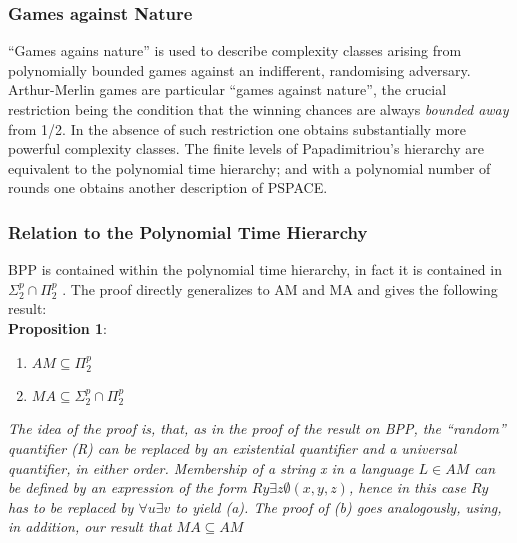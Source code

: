 \documentclass{beamer}
\begin{document}

\begin{frame}
\frametitle{Games against Nature}
``Games agains nature'' is used to describe complexity classes arising from polynomially bounded games against an indifferent, randomising adversary. Arthur-Merlin games are particular ``games against nature'', the crucial restriction being the condition that the winning chances are always \textit{bounded away} from 1/2. In the absence of such restriction one obtains substantially more powerful complexity classes. The finite levels of Papadimitriou’s hierarchy are equivalent to the polynomial time hierarchy; and with a polynomial number of rounds one obtains another description of PSPACE.
\end{frame}

\begin{frame}
\frametitle{Relation to the Polynomial Time Hierarchy}
BPP is contained within the polynomial time hierarchy, in fact it is contained in $\Sigma_2^p \cap \Pi_2^p$ . The proof directly generalizes to AM and MA and gives the following result:\\
\textbf{Proposition 1}:\begin{enumerate}
\item $AM \subseteq \Pi_2^p$
\item   $MA \subseteq \Sigma_2^p \cap \Pi_2^p$
\end{enumerate}
\textit{ The idea of the proof is, that, as in the proof of the result on BPP, the ``random” quantifier (R) can be replaced by an existential quantifier and a universal quantifier, in either order. Membership of a string x in a language $L \in AM$ can be defined by an expression of the form $Ry \exists z \emptyset (x, y, z)$, hence in this case $Ry$ has to be replaced by $\forall u \exists v$ to yield (a). The proof of (b) goes analogously, using, in addition, our result that $MA \subseteq AM$}
\end{frame}
\end{document}
